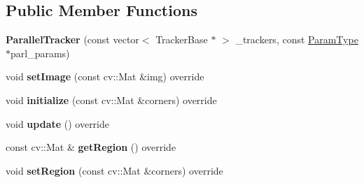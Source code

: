 \subsection*{Public Member Functions}
\begin{DoxyCompactItemize}
\item 
\hypertarget{classParallelTracker_a645a934166103676c0f5ea1a83b3a3ee}{{\bfseries Parallel\-Tracker} (const vector$<$ Tracker\-Base $\ast$ $>$ \-\_\-trackers, const \hyperlink{structParallelParams}{Param\-Type} $\ast$parl\-\_\-params)}\label{classParallelTracker_a645a934166103676c0f5ea1a83b3a3ee}

\item 
\hypertarget{classParallelTracker_a969ac44ccfbb8d0b73edf98fa19b1d07}{void {\bfseries set\-Image} (const cv\-::\-Mat \&img) override}\label{classParallelTracker_a969ac44ccfbb8d0b73edf98fa19b1d07}

\item 
\hypertarget{classParallelTracker_a148e190d1535deaf261e7434cc98c9d2}{void {\bfseries initialize} (const cv\-::\-Mat \&corners) override}\label{classParallelTracker_a148e190d1535deaf261e7434cc98c9d2}

\item 
\hypertarget{classParallelTracker_a6942daca56cf3da0e06831a34a70f5c5}{void {\bfseries update} () override}\label{classParallelTracker_a6942daca56cf3da0e06831a34a70f5c5}

\item 
\hypertarget{classParallelTracker_a53787aaf11ec49896ba5ef71a520b322}{const cv\-::\-Mat \& {\bfseries get\-Region} () override}\label{classParallelTracker_a53787aaf11ec49896ba5ef71a520b322}

\item 
\hypertarget{classParallelTracker_a090d725a1b06c25eea4043941048af73}{void {\bfseries set\-Region} (const cv\-::\-Mat \&corners) override}\label{classParallelTracker_a090d725a1b06c25eea4043941048af73}

\end{DoxyCompactItemize}
